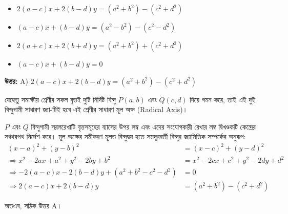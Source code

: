 \documentclass[12pt, a4paper]{article}
\begin{document}
\begin{itemize}[label={}, leftmargin=1cm, itemsep=0.5em]
    \item[\textbf{A)}] $2(a-c)x + 2(b-d)y = (a^2+b^2) - (c^2+d^2)$
    \item[\textbf{B)}] $(a-c)x + (b-d)y = (a^2-b^2) - (c^2-d^2)$
    \item[\textbf{C)}] $2(a+c)x + 2(b+d)y = (a^2+b^2) + (c^2+d^2)$
    \item[\textbf{D)}] $(a-c)x + (b-d)y = 0$
\end{itemize}

\vspace{0.5em}
\begin{tcolorbox}[answerbox]
    \textbf{\color{success} উত্তর:} A) $2(a-c)x + 2(b-d)y = (a^2+b^2) - (c^2+d^2)$
\end{tcolorbox}
\vspace{1em}

\begin{tcolorbox}[solutionbox={সমাধান (Solution)}]
    \noindent
    যেহেতু সমাক্ষীয় শ্রেণীর সকল বৃত্তই দুটি নির্দিষ্ট বিন্দু $P(a, b)$ এবং $Q(c, d)$ দিয়ে গমন করে, তাই এই দুই বিন্দুগামী সাধারণ জ্যা-টিই হবে এই শ্রেণীর সাধারণ মূল অক্ষ (Radical Axis)।
    
    \vspace{0.5em}
    $P$ এবং $Q$ বিন্দুগামী সরলরেখাটি বৃত্তসমূহের ব্যাসের উপর লম্ব এবং এদের সংযোগকারী রেখার লম্ব দ্বিখণ্ডকটি কেন্দ্রের সঞ্চারপথ নির্দেশ করে। মূল অক্ষের সমীকরণ মূলত বিন্দুদ্বয় হতে সমদূরবর্তী বিন্দুর জ্যামিতিক সম্পর্কের অনুরূপ:
    \begin{align*}
        (x - a)^2 + (y - b)^2 &= (x - c)^2 + (y - d)^2 \\
        \Rightarrow x^2 - 2ax + a^2 + y^2 - 2by + b^2 &= x^2 - 2cx + c^2 + y^2 - 2dy + d^2 \\
        \Rightarrow -2(a-c)x - 2(b-d)y + (a^2 + b^2 - c^2 - d^2) &= 0 \\
        \Rightarrow 2(a-c)x + 2(b-d)y &= (a^2+b^2) - (c^2+d^2)
    \end{align*}
    
    \vspace{0.5em}
    অতএব, সঠিক উত্তর A।
\end{tcolorbox}
\end{document}
